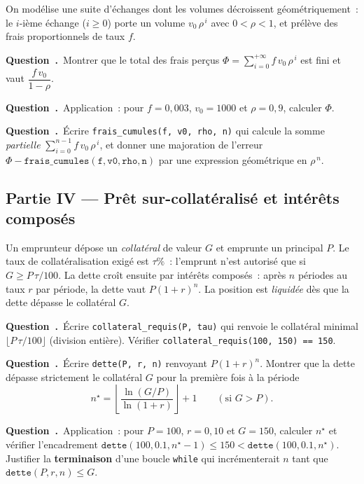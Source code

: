 \documentclass[11pt,a4paper]{article}
\newcounter{qcnt}
\newcommand{\Q}{\medskip\par\stepcounter{qcnt}\noindent\textbf{Question~\theqcnt.}~}
\newcommand{\code}[1]{\lstinline!#1!}
\begin{document}
On modélise une suite d'échanges dont les volumes décroissent géométriquement~: le $i$-ième
échange ($i \ge 0$) porte un volume $v_0\,\rho^{\,i}$ avec $0 < \rho < 1$, et prélève des frais
proportionnels de taux $f$.

\Q Montrer que le total des frais perçus $\displaystyle \Phi = \sum_{i=0}^{+\infty} f\,v_0\,
\rho^{\,i}$ est fini et vaut $\dfrac{f\,v_0}{1-\rho}$.

\Q Application~: pour $f = 0{,}003$, $v_0 = 1000$ et $\rho = 0{,}9$, calculer $\Phi$.

\Q Écrire \code{frais_cumules(f, v0, rho, n)} qui calcule la somme \emph{partielle}
$\sum_{i=0}^{n-1} f\,v_0\,\rho^{\,i}$, et donner une majoration de l'erreur
$\Phi - \mathtt{frais\_cumules(f, v0, rho, n)}$ par une expression géométrique en $\rho^{\,n}$.

\subsection*{Partie IV --- Prêt sur-collatéralisé et intérêts composés}

Un emprunteur dépose un \emph{collatéral} de valeur $G$ et emprunte un principal $P$. Le taux de
collatéralisation exigé est $\tau\%$~: l'emprunt n'est autorisé que si $G \ge P\,\tau/100$. La dette
croît ensuite par intérêts composés~: après $n$ périodes au taux $r$ par période, la dette vaut
$P(1+r)^n$. La position est \emph{liquidée} dès que la dette dépasse le collatéral $G$.

\Q Écrire \code{collateral_requis(P, tau)} qui renvoie le collatéral minimal $\lfloor P\,\tau/100
\rfloor$ (division entière). Vérifier \code{collateral_requis(100, 150) == 150}.

\Q Écrire \code{dette(P, r, n)} renvoyant $P(1+r)^n$. Montrer que la dette dépasse strictement le
collatéral $G$ pour la première fois à la période
$$n^{\star} = \left\lfloor \frac{\ln(G/P)}{\ln(1+r)} \right\rfloor + 1
\qquad (\text{si } G > P).$$

\Q Application~: pour $P = 100$, $r = 0{,}10$ et $G = 150$, calculer $n^{\star}$ et vérifier
l'encadrement $\mathtt{dette}(100, 0.1, n^{\star}-1) \le 150 < \mathtt{dette}(100, 0.1, n^{\star})$.
Justifier la \textbf{terminaison} d'une boucle \code{while} qui incrémenterait $n$ tant que
$\mathtt{dette}(P, r, n) \le G$.
\end{document}
